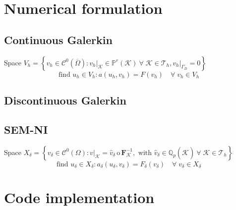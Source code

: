 \documentclass[a4paper,11pt]{article}
\theoremstyle{break}
\newcommand{\vect}[1]{\textbf{#1}}
\newcommand*{\txt}[1]{\text{#1}}
\newcommand*{\limited}[1]{\vert_{#1}}
\newcommand{\element}{\mathcal{K}}
\newcommand{\triangulation}{\mathcal{T}_h}
\newcommand{\eit}{{\element\in\triangulation}}
\newcommand{\find}{\txt{find }}
\numberwithin{equation}{section}
\begin{document}
\section*{Numerical formulation}
\subsection*{Continuous Galerkin}
Space \(V_h = \left\{ v_h \in \mathcal{C}^0(\overline{\Omega}) : v_h\limited{\element} \in \mathbb{P}^r(\element) \ \forall \; \eit, v_h\limited{\Gamma_D} = 0 \right\}\)
\[
    \find u_h \in V_h : a(u_h,v_h) = F(v_h) \quad \forall \; v_h \in V_h
\]
\subsection*{Discontinuous Galerkin}
\subsection*{SEM-NI}

Space \(X_\delta= \left\{ v_\delta \in \mathcal{C}^0(\Omega) : v\limited{\element} = \hat{v}_\delta \, \mathrm{o}\, \vect{F}^{-1}_\element, \txt{ with } \hat{v}_\delta \in \mathbb{Q}_p(\hat{\element}) \ \forall \; \eit \right\}\)
\[
    \find u_\delta \in X_\delta : a_\delta(u_\delta, v_\delta) = F_\delta(v_\delta) \quad \forall \; v_\delta \in X_\delta
\]
\section*{Code implementation}
\end{document}
